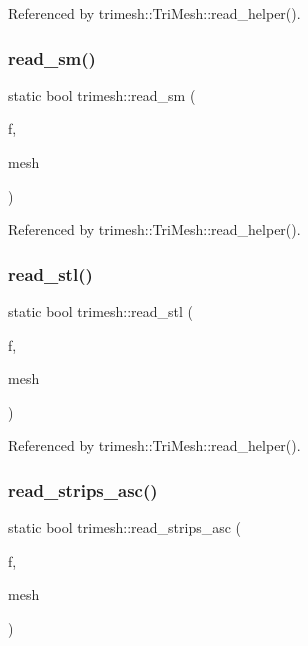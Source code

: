 Referenced by trimesh\+::\+Tri\+Mesh\+::read\+\_\+helper().

\mbox{\label{namespacetrimesh_a0a31a91f293a9ead6c5c3f87e5e234dc}} 
\subsubsection{\texorpdfstring{read\+\_\+sm()}{read\_sm()}}
{\footnotesize\ttfamily static bool trimesh\+::read\+\_\+sm (\begin{DoxyParamCaption}\item[{F\+I\+LE $\ast$}]{f,  }\item[{\hyperlink{classtrimesh_1_1TriMesh}{Tri\+Mesh} $\ast$}]{mesh }\end{DoxyParamCaption})\hspace{0.3cm}{\ttfamily [static]}}



Referenced by trimesh\+::\+Tri\+Mesh\+::read\+\_\+helper().

\mbox{\label{namespacetrimesh_acbe4673a2ddcbb3b2ec550b7f16b8f2c}} 
\subsubsection{\texorpdfstring{read\+\_\+stl()}{read\_stl()}}
{\footnotesize\ttfamily static bool trimesh\+::read\+\_\+stl (\begin{DoxyParamCaption}\item[{F\+I\+LE $\ast$}]{f,  }\item[{\hyperlink{classtrimesh_1_1TriMesh}{Tri\+Mesh} $\ast$}]{mesh }\end{DoxyParamCaption})\hspace{0.3cm}{\ttfamily [static]}}



Referenced by trimesh\+::\+Tri\+Mesh\+::read\+\_\+helper().

\mbox{\label{namespacetrimesh_ab480e9956963f146c83561c700c166b2}} 
\subsubsection{\texorpdfstring{read\+\_\+strips\+\_\+asc()}{read\_strips\_asc()}}
{\footnotesize\ttfamily static bool trimesh\+::read\+\_\+strips\+\_\+asc (\begin{DoxyParamCaption}\item[{F\+I\+LE $\ast$}]{f,  }\item[{\hyperlink{classtrimesh_1_1TriMesh}{Tri\+Mesh} $\ast$}]{mesh }\end{DoxyParamCaption})\hspace{0.3cm}{\ttfamily [static]}}



